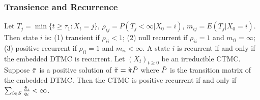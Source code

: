 \subsubsection*{Transience and Recurrence}
 Let $T_j = \min\{t \ge \tau_1 : X_t = j\}$, $\rho_{ij} = P(T_j < \infty | X_0 = i)$, $m_{ij} = E(T_j |X_0 = i).$ Then state $i$ is:
(1) transient if $\rho_{ii} < 1$;
(2) null recurrent if $\rho_{ii} = 1$ and $m_{ii} = \infty$;
(3) positive recurrent if $\rho_{ii} = 1$ and $m_{ii} < \infty$.
 A state $i$ is recurrent if and only if the embedded DTMC is recurrent.
 Let $(X_t)_{t \ge 0}$ be an irreducible CTMC. Suppose $\Tilde{\pi}$ is a positive solution of $\Tilde{\pi} = \Tilde{\pi}\Tilde{P}$ where $\Tilde{P}$ is the transition matrix of the embedded DTMC. Then the CTMC is positive recurrent if and only if $\sum_{i \in S} \frac{\Tilde{\pi}_i}{q_i} < \infty$.